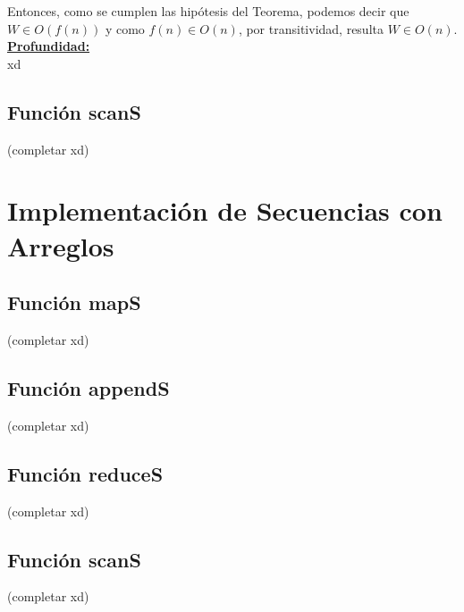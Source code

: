 \documentclass[11pt]{article}
\begin{document}
Entonces, como se cumplen las hipótesis del Teorema, podemos decir que $W \in O(f(n))$ y
como $f(n) \in O(n)$, por transitividad, resulta $W \in O(n)$. \\

\textbf{\underline{Profundidad:}} \\
xd

\subsection*{Función scanS}

(completar xd)


\section*{Implementación de Secuencias con Arreglos}

\subsection*{Función mapS}
(completar xd)

\subsection*{Función appendS}
(completar xd)

\subsection*{Función reduceS}
(completar xd)

\subsection*{Función scanS}
(completar xd)
\end{document}
